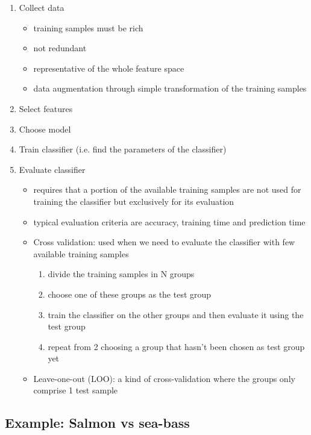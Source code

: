\documentclass[oneside,onecolumn]{report}
\begin{document}
\begin{enumerate}
    \item Collect data
    \begin{itemize}
        \item training samples must be rich
        \item not redundant
        \item representative of the whole feature space
        \item data augmentation through simple transformation of the training samples
    \end{itemize}
    \item Select features
    \item Choose model
    \item Train classifier (i.e. find the parameters of the classifier)
    \item Evaluate classifier
    \begin{itemize}
        \item requires that a portion of the available training samples are not used for training the classifier but exclusively for its evaluation
        \item typical evaluation criteria are accuracy, training time and prediction time
        \item Cross validation: used when we need to evaluate the classifier with few available training samples
        \begin{enumerate}
            \item divide the training samples in N groups
            \item choose one of these groups as the test group
            \item train the classifier on the other groups and then evaluate it using the test group
            \item repeat from 2 choosing a group that hasn’t been chosen as test group yet
        \end{enumerate}
        \item Leave-one-out (LOO): a kind of cross-validation where the groups only comprise 1 test sample
    \end{itemize}
\end{enumerate}


\subsection{Example: Salmon vs sea-bass}
\end{document}
